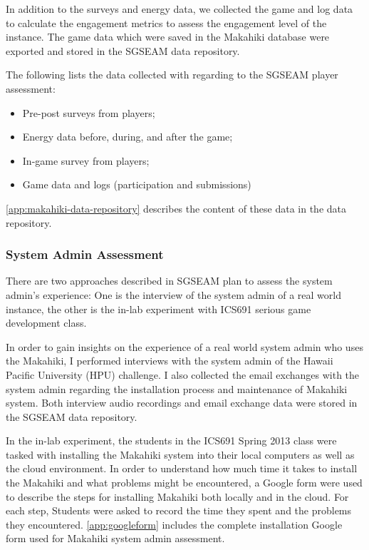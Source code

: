 In addition to the surveys and energy data, we collected the game and log data to calculate the engagement metrics to assess the engagement level of the instance. The game data which were saved in the Makahiki database were exported and stored in the SGSEAM data repository.

The following lists the data collected with regarding to the SGSEAM player assessment:

\begin{itemize}
\item Pre-post surveys from players;
\item Energy data before, during, and after the game; 
\item In-game survey from players;
\item Game data and logs (participation and submissions)
\end{itemize}

\autoref{app:makahiki-data-repository} describes the content of these data in the data repository.

\subsubsection{System Admin Assessment}

There are two approaches described in SGSEAM plan to assess the system admin's experience: One is the interview of the system admin of a real world instance, the other is the in-lab experiment with ICS691 serious game development class.

In order to gain insights on the experience of a real world system admin who uses the Makahiki, I performed interviews with the system admin of the Hawaii Pacific University (HPU) challenge.  I also collected the email exchanges with the system admin regarding the installation process and maintenance of Makahiki system. Both interview audio recordings and email exchange data were stored in the SGSEAM data repository.

In the in-lab experiment, the students in the ICS691 Spring 2013 class were tasked with installing the Makahiki system into their local computers as well as the cloud environment. In order to understand how much time it takes to install the Makahiki and what problems might be encountered, a Google form were used to describe the steps for installing Makahiki both locally and in the cloud. For each step, Students were asked to record the time they spent and the problems they encountered. \autoref{app:googleform} includes the complete installation Google form used for Makahiki system admin assessment.

